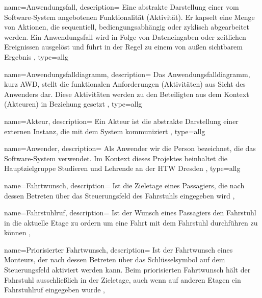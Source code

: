 

{
	name=Anwendungsfall,
	description={
		Eine abstrakte Darstellung einer vom Software-System angebotenen \newline Funktionalität (Aktivität). Er kapselt eine Menge von Aktionen, die sequentiell, bediengungsabhängig oder zyklisch abgearbeitet werden. Ein Anwendungsfall wird in Folge von Dateneingaben oder zeitlichen Ereignissen ausgelöst und führt in der Regel zu einem von au{\ss}en sichtbarem Ergebnis
		},
	type=allg
}

{
	name=Anwendungsfalldiagramm,
	description={
		Das Anwendungsfalldiagramm, kurz AWD, stellt die funktionalen Anforderungen (Aktivitäten) aus Sicht des Anwenders dar. Diese Aktivitäten werden zu den Beteiligten aus dem Kontext (Akteuren) in Beziehung gesetzt
		},
	type=allg
}

{
	name=Akteur,
	description={
		Ein Akteur ist die abstrakte Darstellung einer externen Instanz, die mit dem System kommuniziert
	},
	type=allg
}

{
	name=Anwender,
	description={
		Als Anwender wir die Person bezeichnet, die das Software-System verwendet. Im Kontext dieses Projektes beinhaltet die Hauptzielgruppe Studieren und Lehrende an der HTW Dresden
	},
	type=allg
}

{
	name=Fahrtwunsch,
	description={
		Ist die Zieletage eines \gls{Passagier}s, die nach dessen Betreten über das \gls{Steuerungsfeld} des Fahrstuhls eingegeben wird
		},
}

{
	name=Fahrstuhlruf,
	description={
		Ist der Wunsch eines \gls{Passagier}s den Fahrstuhl in die aktuelle Etage zu ordern um eine Fahrt mit dem Fahrstuhl durchführen zu können
	},
}

{
	name=Priorisierter Fahrtwunsch,
	description={
		Ist der \gls{Fahrtwunsch} eines \gls{Monteur}s, der nach dessen Betreten über das Schlüsselsymbol auf dem \gls{Steuerungsfeld} aktiviert werden kann. Beim priorisierten Fahrtwunsch hält der Fahrstuhl ausschließlich in der Ziel\-etage, auch wenn auf anderen Etagen ein \gls{Fahrstuhlruf} eingegeben wurde
	},
}

